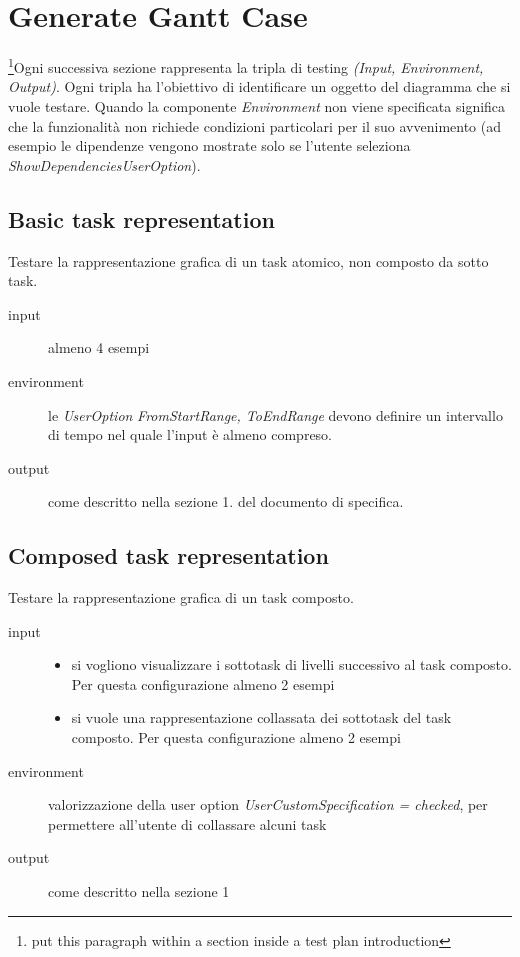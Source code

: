 \chapter{Generate Gantt Case}
\label{chap:generateGantt}

\footnote{put this paragraph within a section inside a test plan
introduction}Ogni successiva sezione rappresenta la tripla di testing
\emph{(Input, Environment, Output)}. Ogni tripla ha l'obiettivo di identificare un oggetto del diagramma che si vuole testare. Quando la componente \emph{Environment} non
viene specificata significa che la funzionalit\`a non richiede condizioni
particolari per il suo avvenimento (ad esempio le dipendenze vengono mostrate
solo se l'utente seleziona \emph{ShowDependenciesUserOption}).

\section{Basic task representation}
Testare la rappresentazione grafica di un task atomico, non composto da sotto
task.
\begin{description}
\item[input] almeno 4 esempi
\item[environment] le \emph{UserOption} \emph{FromStartRange, ToEndRange}
devono definire un intervallo di tempo nel quale l'input \`e almeno compreso.
\item[output] come descritto nella sezione 1. del
documento di specifica.
\end{description}

\section{Composed task representation}
Testare la rappresentazione grafica di un task composto.
\begin{description}
\item[input] 
\quad
\begin{itemize}
  \item si vogliono visualizzare i sottotask di livelli successivo al task
  composto. Per questa configurazione almeno 2 esempi
  \item si vuole una rappresentazione collassata dei sottotask del task
  composto. Per questa configurazione almeno 2 esempi
\end{itemize}
\item[environment] valorizzazione della user option
\emph{UserCustomSpecification = checked}, per permettere all'utente di
collassare alcuni task
\item[output] come descritto nella sezione 1
\end{description}

